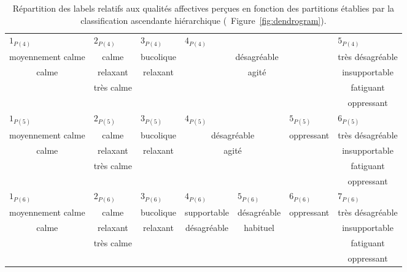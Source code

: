 \begin{table}[t]
\begin{tabular}{c|c|c|c|c|c|c}
\hline
\multicolumn{1}{l|}{$1_{P(4)}$} & \multicolumn{1}{l|}{$2_{P(4)}$} & \multicolumn{1}{l|}{$3_{P(4)}$}  & \multicolumn{3}{l|}{$4_{P(4)}$} & \multicolumn{1}{l}{$5_{P(4)}$} \\
moyennement calme         & calme       & bucolique  & \multicolumn{3}{c|}{désagréable} & très désagréable\\
calme                & relaxant   & relaxant & \multicolumn{3}{c|}{agité}   & insupportable\\
                     & très calme  &          & \multicolumn{3}{c|}{}           & fatiguant\\
                     &            &          & \multicolumn{3}{c|}{}           & oppressant\\                                      
\hline
\multicolumn{1}{l|}{$1_{P(5)}$} & \multicolumn{1}{l|}{$2_{P(5)}$} & \multicolumn{1}{l|}{$3_{P(5)}$}  & \multicolumn{2}{l|}{$4_{P(5)}$} & \multicolumn{1}{l|}{$5_{P(5)}$} & \multicolumn{1}{l}{$6_{P(5)}$}\\ 
moyennement calme          & calme      & bucolique  & \multicolumn{2}{c|}{désagréable} & oppressant & très désagréable\\     
calme                 & relaxant   & relaxant   & \multicolumn{2}{c|}{agité}       &            & insupportable\\  
                      & très calme &            & \multicolumn{2}{c|}{}            &            & fatiguant \\  
                      &            &            & \multicolumn{2}{c|}{}            &            & oppressant \\               
\hline
\multicolumn{1}{l|}{$1_{P(6)}$} & \multicolumn{1}{l|}{$2_{P(6)}$} & \multicolumn{1}{l|}{$3_{P(6)}$}  & \multicolumn{1}{l|}{$4_{P(6)}$} & \multicolumn{1}{l|}{$5_{P(6)}$} & \multicolumn{1}{l|}{$6_{P(6)}$} & \multicolumn{1}{l}{$7_{P(6)}$} \\  
moyennement calme          & calme      & bucolique  & supportable    & désagréable  & oppressant & très désagréable \\        
calme                 & relaxant   & relaxant  & désagréable     & habituel     &            & insupportable \\  
                      & très calme &           &                 &              &            & fatiguant\\  
                      &            &           &                 &              &            & oppressant \\  
\hline
\end{tabular} 
\vspace{0.5mm}
\caption[Répartition des labels relatifs aux qualités affectives perçues en fonction des partitions établies par la classification ascendante hiérarchique.]{Répartition des labels relatifs aux qualités affectives perçues en fonction des partitions établies par la classification ascendante hiérarchique (\cf~Figure~\ref{fig:dendrogram}).}
\label{tab:markerHacQualite}
\end{table}

